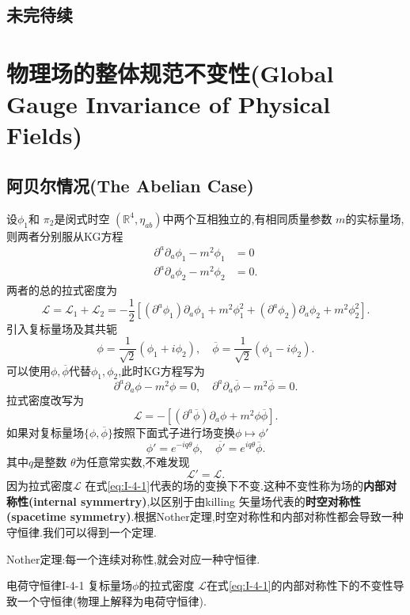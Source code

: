 \documentclass[../main.tex]{subfiles}
\begin{document}
\section{未完待续}
\chapter{物理场的整体规范不变性(Global Gauge Invariance of Physical Fields)}
\section{阿贝尔情况(The Abelian Case)}
设$\phi_1$和 $\pi_2$是闵式时空 $(\mathbb{R}^4,\eta_{ab})$中两个互相独立的,有相同质量参数 $m$的实标量场,则两者分别服从KG方程
\begin{align*}
  \partial^a\partial_a \phi_1 - m^2 \phi_1 &= 0 \\
  \partial^a\partial_a \phi_2 - m^2\phi_2 & = 0
.\end{align*}
两者的总的拉式密度为\[
  \mathscr{L} = \mathscr{L}_1 + \mathscr{L}_2 = -\frac{1}{2}[(\partial^a\phi_1)\partial_a \phi_1 + m^2 \phi_1^2+(\partial^a\phi_2)\partial_a \phi_2 + m^2 \phi_2^2]
.\] 
引入复标量场及其共轭\[
\phi = \frac{1}{\sqrt{2}}(\phi_1 + i\phi_2),\quad \overline{\phi} = \frac{1}{\sqrt{2} }(\phi_1- i\phi_2)
.\] 
可以使用$\phi,\overline{\phi}$代替$\phi_1,\phi_2$,此时KG方程写为 \[
\partial^a\partial_a \phi - m^2 \phi = 0,\quad \partial^a\partial_a \overline{\phi} - m^2 \overline{\phi} =0
.\] 
拉式密度改写为\[
  \mathscr{L} = -[(\partial^a \overline{\phi})\partial_a \phi + m^2\phi \overline{\phi}]
.\] 
如果对复标量场$\{\phi,\overline{\phi}\}$按照下面式子进行场变换$\phi \mapsto \phi'$
\begin{equation}
  \label{eq:I-4-1}
  \phi' = e^{-iq\theta}\phi, \quad \overline{\phi'} = e^{iq\theta}\overline{\phi}
. \end{equation}
其中$q$是整数 $\theta$为任意常实数,不难发现 \[
\mathscr{L}' = \mathscr{L}
.\]
因为拉式密度$\mathscr{L}$ 在式\ref{eq:I-4-1}代表的场的变换下不变.这种不变性称为场的\textbf{内部对称性(internal symmertry)},以区别于由killing
矢量场代表的\textbf{时空对称性(spacetime symmetry)}.根据Nother定理,时空对称性和内部对称性都会导致一种守恒律.我们可以得到一个定理.
\begin{note}
 Nother定理:每一个连续对称性,就会对应一种守恒律. 
\end{note}
\begin{theorem}
  {电荷守恒律}{I-4-1}
  复标量场$\phi$的拉式密度 $\mathscr{L}$在式\ref{eq:I-4-1}的内部对称性下的不变性导致一个守恒律(物理上解释为电荷守恒律).
\end{theorem}
\end{document}
